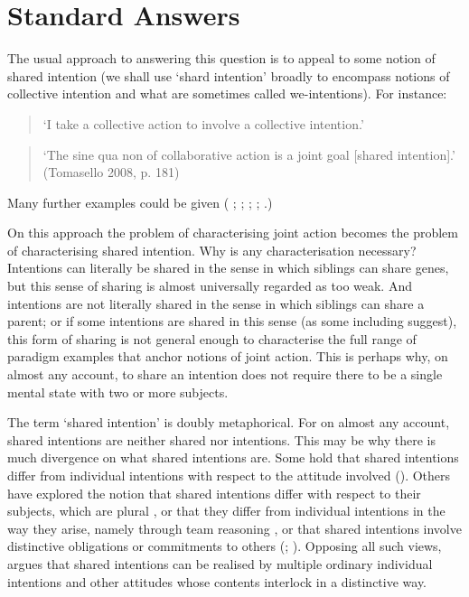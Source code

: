 \documentclass[12pt,a4paper]{extarticle}
\begin{document}
\section{Standard Answers}
The usual approach to answering this question is to appeal to some notion of shared intention (we shall use `shard intention' broadly to encompass notions of collective intention and what are sometimes called we-intentions).
For instance:  
%
\begin{quote} 
`I take a collective action to involve a collective intention.'  \citep[p.\ 5]{Gilbert:2006wr}
\end{quote}
%
\begin{quote} 
`The sine qua non of collaborative action is a joint goal [shared intention].’ 
(Tomasello 2008, p. 181)
\end{quote} 
%
Many further examples could be given  (%
	\citealp[p.\ 381]{Carpenter:2009wq}; 
	\citealp[p.\ 369]{Call:2009fk};
	\citealp{Kutz:2000si}; 
	\citealp[p.\ 117]{rakoczy_pretend_2006}; 
	\citealp{Tollefsen:2005vh}%
	.)

On this approach the problem of characterising joint action becomes the problem of characterising shared intention.
Why is any characterisation necessary?
Intentions can literally be shared in the sense in which siblings can share genes, but this sense of sharing is almost universally regarded as too weak.
And intentions are not literally shared in the sense in which siblings can share a parent; or if some intentions are shared in this sense (as some including \citealp{Velleman:1997oo} suggest), this form of sharing is not general enough to characterise the full range of paradigm examples that anchor notions of joint action.
This is perhaps why, on almost any account, to share an intention does not require there to be a single mental state with two or more subjects.

The term `shared intention' is doubly metaphorical.
For on almost any account, shared intentions are neither shared nor intentions.
This may be why there is {much divergence on what shared intentions are}. 
Some hold that shared intentions differ from individual intentions with respect to the attitude involved (\citealp{Searle:1990em}). 
Others have explored the notion that shared intentions differ with respect to their subjects, which are plural \citep{Gilbert:1992rs,helm_plural_2008}, 
or that they differ from individual intentions in the way they arise, namely through team reasoning \citep{Gold:2007zd}, 
or that shared intentions involve distinctive obligations or commitments to others (\citealp{Gilbert:1992rs}; \citealp{Roth:2004ki}).
Opposing all such views, \citet{Bratman:1992mi,Bratman:2009lv} argues that shared intentions can be realised by multiple ordinary individual intentions and other attitudes whose contents interlock in a distinctive way. 
\end{document}
